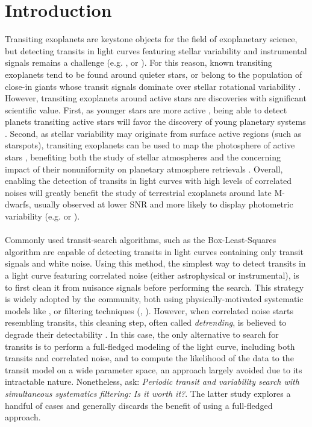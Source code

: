\documentclass[modern,linenumbers]{aastex631}
\begin{document}
\section*{Introduction}
Transiting exoplanets are keystone objects for the field of exoplanetary science, but detecting transits in light curves featuring stellar variability and instrumental signals remains a challenge (e.g. \citealt{Pont2006}, \citealt{Howell2016} or \citealt{Yaptangco2024}). For this reason, known transiting exoplanets tend to be found around quieter stars, or belong to the population of close-in giants whose transit signals dominate over stellar rotational variability \citep{Simpson2023}. However, transiting exoplanets around active stars are discoveries with significant scientific value. First, as younger stars are more active \citep{Skumanich1972}, being able to detect planets transiting active stars will favor the discovery of young planetary systems \citep[e.g.][]{Newton2022}. Second, as stellar variability may originate from surface active regions (such as starspots), transiting exoplanets can be used to map the photosphere of active stars \citep[e.g.][]{Morris2017}, benefiting both the study of stellar atmospheres and the concerning impact of their nonuniformity on planetary atmosphere retrievals \citep{rackham2018}. Overall, enabling the detection of transits in light curves with high levels of correlated noises will greatly benefit the study of terrestrial exoplanets around late M-dwarfs, usually observed at lower SNR and more likely to display photometric variability (e.g. \citealt{Murray2020} or \citealt{Petrucci2024}).
\\\\
Commonly used transit-search algorithms, such as the Box-Least-Squares algorithm \citep[BLS,][]{bls} are capable of detecting transits in light curves containing only transit signals and white noise. Using this method, the simplest way to detect transits in a light curve featuring correlated noise (either astrophysical or instrumental), is to first clean it from nuisance signals before performing the search. This strategy is widely adopted by the community, both using physically-motivated systematic models like \cite{everest1, everest2}, or filtering techniques (\citealt{Jenkins2010}, \citealt{wotan}). However, when correlated noise starts resembling transits, this cleaning step, often called \textit{detrending}, is believed to degrade their detectability \cite[see subsection 4.3 of][]{wotan}. In this case, the only alternative to search for transits is to perform a full-fledged modeling of the light curve, including both transits and correlated noise, and to compute the likelihood of the data to the transit model on a wide parameter space, an approach largely avoided due to its intractable nature. Nonetheless, \cite{kovacs2016} ask: \textit{Periodic transit and variability search with simultaneous systematics filtering: Is it worth it?}. The latter study explores a handful of cases and generally discards the benefit of using a full-fledged approach.\\\\
\end{document}
